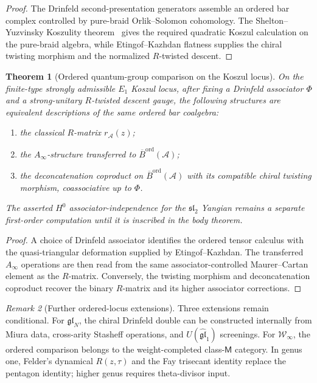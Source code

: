 \documentclass[11pt,reqno]{amsart}
\newtheorem{theorem}{Theorem}[section]
\theoremstyle{definition}
\theoremstyle{remark}
\newtheorem{remark}[theorem]{Remark}
\newcommand{\cA}{\mathcal{A}}
\newcommand{\cW}{\mathcal{W}}
\newcommand{\Barord}{\overline{B}^{\mathrm{ord}}}
\numberwithin{equation}{section}
\begin{document}
\begin{proof}
The Drinfeld second-presentation generators assemble an ordered bar
complex controlled by pure-braid Orlik--Solomon cohomology. The
Shelton--Yuzvinsky Koszulity theorem~\cite{SheltonYuzvinsky97}
gives the required quadratic
Koszul calculation on the pure-braid algebra, while
Etingof--Kazhdan flatness supplies the chiral twisting morphism and
the normalized $R$-twisted descent.
\end{proof}

\begin{theorem}[Ordered quantum-group comparison on the Koszul locus]
\label{thm:ordered-qg-comparison}
On the finite-type strongly admissible $E_1$ Koszul locus, after
fixing a Drinfeld associator $\Phi$ and a strong-unitary
$R$-twisted descent gauge, the following structures are equivalent
descriptions of the same ordered bar coalgebra:
\begin{enumerate}[label=\textup{(\roman*)},leftmargin=2.2em]
\item the classical $R$-matrix $r_\cA(z)$;
\item the $A_\infty$-structure transferred to $\Barord(\cA)$;
\item the deconcatenation coproduct on $\Barord(\cA)$ with its
compatible chiral twisting morphism, coassociative up to $\Phi$.
\end{enumerate}
The asserted $H^0$ associator-independence for the
$\mathfrak{sl}_2$ Yangian remains a separate first-order
computation until it is inscribed in the body theorem.
\end{theorem}

\begin{proof}
A choice of Drinfeld associator identifies the ordered tensor
calculus with the quasi-triangular deformation supplied by
Etingof--Kazhdan. The transferred $A_\infty$ operations are then
read from the same associator-controlled Maurer--Cartan element as
the $R$-matrix. Conversely, the twisting morphism and
deconcatenation coproduct recover the binary $R$-matrix and its
higher associator corrections.
\end{proof}

\begin{remark}[Further ordered-locus extensions]
Three extensions remain conditional.
For $\mathfrak{gl}_N$, the chiral Drinfeld double can be constructed
internally from Miura data, cross-arity Stasheff operations, and
$U(\widehat{\mathfrak{gl}}_1)$ screenings.  For
$\cW_\infty$, the ordered comparison belongs to the
weight-completed class-$\mathsf M$ category. In genus one, Felder's
dynamical $R(z,\tau)$ and the Fay trisecant identity
\cite{Felder94,Fay73} replace the pentagon identity; higher genus
requires theta-divisor input.
\end{remark}
\end{document}
